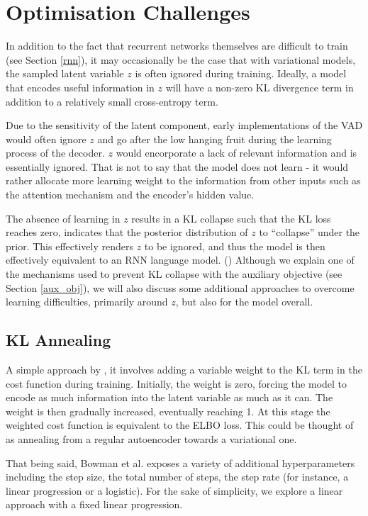 \documentclass[12pt,twoside]{report}
\begin{document}
\section{Optimisation Challenges}
\label{optimisation_challenges}

In addition to the fact that recurrent networks themselves are difficult to train (see Section \ref{rnn}), it may occasionally be the case that with variational models, the sampled latent variable $z$ is often ignored during training. Ideally, a model that encodes useful information in $z$ will have a non-zero KL divergence term in addition to a relatively small cross-entropy term. 

Due to the sensitivity of the latent component, early implementations of the VAD would often ignore $z$ and go after the low hanging fruit during the learning process of the decoder. $z$ would encorporate a lack of relevant information and is essentially ignored. That is not to say that the model does not learn - it would rather allocate more learning weight to the information from other inputs such as the attention mechanism and the encoder's hidden value.

The absence of learning in $z$ results in a KL collapse such that the KL loss reaches zero, indicates that the posterior distribution of $z$ to ``collapse'' under the prior. This effectively renders $z$ to be ignored, and thus the model is then effectively equivalent to an RNN language model. (\cite{bowman_generating_2015}) Although we explain one of the mechanisms used to prevent KL collapse with the auxiliary objective (see Section \ref{aux_obj}), we will also discuss some additional approaches to overcome learning difficulties, primarily around $z$, but also for the model overall.

\subsection{KL Annealing}

A simple approach by \cite{bowman_generating_2015}, it involves adding a variable weight to the KL term in the cost function during training. Initially, the weight is zero, forcing the model to encode as much information into the latent variable as much as it can. The weight is then gradually increased, eventually reaching 1. At this stage the weighted cost function is equivalent to the ELBO loss. This could be thought of as annealing from a regular autoencoder towards a variational one.

That being said, Bowman et al. exposes a variety of additional hyperparameters including the step size, the total number of steps, the step rate (for instance, a linear progression or a logistic). For the sake of simplicity, we explore a linear approach with a fixed linear progression.
\end{document}
